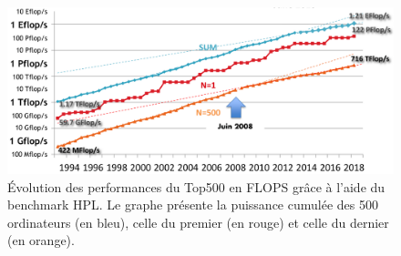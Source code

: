             
    
            \begin{figure}
            \center
            \includegraphics[width=14cm]{images/Top500_Poor.png}
            \caption{\label{fig:Top500_Poor} Évolution des performances du Top500 en \gls{FLOPS} grâce à l'aide du benchmark HPL. Le graphe présente la puissance cumulée des 500 ordinateurs (en bleu), celle du premier (en rouge) et celle du dernier (en orange)\protect\footnotemark.}
            \end{figure}
    
                
            
